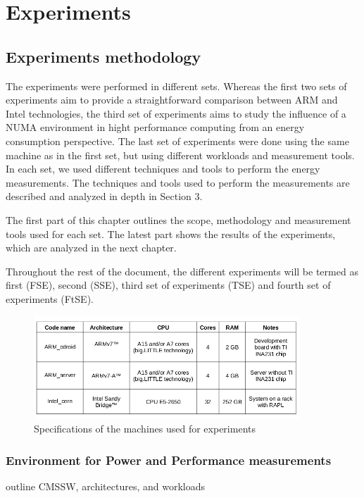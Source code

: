 \chapter{Experiments}

\section{Experiments methodology}

The experiments were performed in different sets. 
Whereas the first two sets of experiments aim to provide a straightforward 
comparison between ARM and Intel technologies, the third set of experiments aims
to study the influence of a NUMA environment in hight performance computing from
an energy consumption perspective. The last set of experiments were done using
the same machine as in the first set, but using different workloads and
measurement tools.
In each set, we used different
techniques and tools to perform the energy measurements. The techniques and tools
used to perform the measurements are described and analyzed in depth in 
Section 3.

The first part of this chapter outlines the scope, methodology and measurement
tools used for each set. The latest part shows the results of the 
experiments, which are analyzed in the next chapter.

Throughout the rest of the document, the different experiments will be termed as
first (FSE), second (SSE), third set of experiments (TSE) and fourth set of
experiments (FtSE). 

\begin{figure}[h!]
  \centering
    \includegraphics[width=100mm]{"img/machine_specs"}
    \caption{Specifications of the machines used for experiments}
    \label{fig:aalto_quad_clamp}
\end{figure}



\subsection{Environment for Power and Performance measurements}
outline CMSSW, architectures, and workloads   

